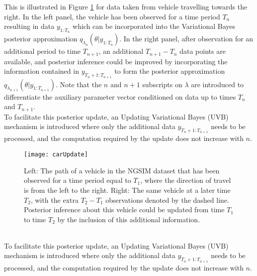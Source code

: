 \documentclass[12pt,a4paper]{article}\usepackage[]{graphicx}\usepackage[]{color}
\begin{document}
This is illustrated in Figure \ref{fig:timeUpdate} for data taken from vehicle travelling towards the right. In the left panel, the vehicle has been observed for a time period $T_{n}$ resulting in data $y_{1:T_{n}}$ which can be incorporated into the Variational Bayes posterior approximation $q_{\lambda_{n}}(\theta | y_{1:T_{n}})$. In the right panel, after observation for an additional period to time $T_{n+1}$, an additional $T_{n+1} - T_{n}$ data points are available, and posterior inference could be improved by incorporating the information contained in $y_{T_{n}+1:T_{n+1}}$ to form the posterior approximation $q_{\lambda_{n+1}}(\theta | y_{1:T_{n+1}})$. Note that the $n$ and $n+1$ subscripts on $\lambda$ are introduced to differentiate the auxiliary parameter vector conditioned on data up to times $T_{n}$ and $T_{n+1}$.
\\

To facilitate this posterior update, an Updating Variational Bayes (UVB) mechanism is introduced where only the additional data $y_{T_{n}+1:T_{n+1}}$ needs to be processed, and the computation required by the update does not increase with $n$.
\begin{figure}[ht]
\centering
\texttt{[image: carUpdate]}
\caption{Left: The path of a vehicle in the NGSIM dataset that has been observed for a time period equal to $T_{1}$, where the direction of travel is from the left to the right. Right: The same vehicle at a later time $T_{2}$, with the extra $T_{2} - T_{1}$ observations denoted by the dashed line. Posterior inference about this vehicle could be updated from time $T_{1}$ to time $T_{2}$ by the inclusion of this additional information.}
\label{fig:timeUpdate}
\end{figure}
\\

To facilitate this posterior update, an Updating Variational Bayes (UVB) mechanism is introduced where only the additional data $y_{T_{n}+1:T_{n+1}}$ needs to be processed, and the computation required by the update does not increase with $n$.
\\
\end{document}
